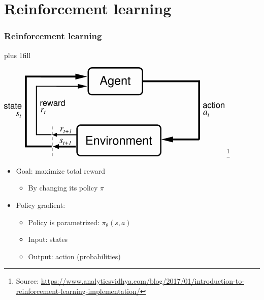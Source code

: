 \section{Reinforcement learning}
\begin{frame}[fragile]\frametitle{Reinforcement learning}
\vskip0pt plus 1fill
\begin{center}
    \includegraphics[width=.7\linewidth]{reinforcementlearning.png}
    \footnote{Source: \url{https://www.analyticsvidhya.com/blog/2017/01/introduction-to-reinforcement-learning-implementation/}}
\end{center}
\begin{itemize}
    \item Goal: maximize total reward
    \begin{itemize}
        \item By changing its policy $\pi$
    \end{itemize}
    \item Policy gradient:
    \begin{itemize}
        \item Policy is parametrized: $\pi_\theta(s,a)$
        \item Input: states
        \item Output: action (probabilities)
    \end{itemize}
\end{itemize}
\end{frame}

